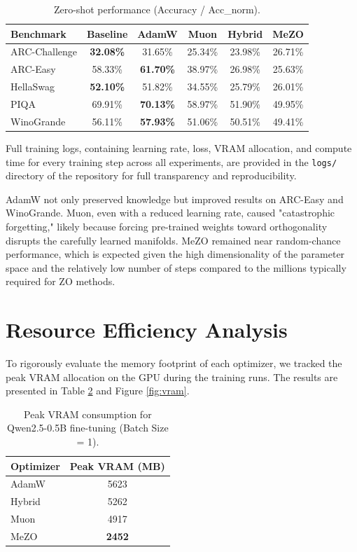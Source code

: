 \documentclass{article}
\begin{document}
\begin{table}[h]
\centering
\begin{tabular}{lccccc}
\toprule
\textbf{Benchmark} & \textbf{Baseline} & \textbf{AdamW} & \textbf{Muon} & \textbf{Hybrid} & \textbf{MeZO} \\
\midrule
ARC-Challenge & \textbf{32.08\%} & 31.65\% & 25.34\% & 23.98\% & 26.71\% \\
ARC-Easy & 58.33\% & \textbf{61.70\%} & 38.97\% & 26.98\% & 25.63\% \\
HellaSwag & \textbf{52.10\%} & 51.82\% & 34.55\% & 25.79\% & 26.01\% \\
PIQA & 69.91\% & \textbf{70.13\%} & 58.97\% & 51.90\% & 49.95\% \\
WinoGrande & 56.11\% & \textbf{57.93\%} & 51.06\% & 50.51\% & 49.41\% \\
\bottomrule
\end{tabular}
\caption{Zero-shot performance (Accuracy / Acc_norm).}
\label{tab:results}
\end{table}

Full training logs, containing learning rate, loss, VRAM allocation, and compute time for every training step across all experiments, are provided in the \texttt{logs/} directory of the repository for full transparency and reproducibility.

AdamW not only preserved knowledge but improved results on ARC-Easy and WinoGrande. Muon, even with a reduced learning rate, caused "catastrophic forgetting," likely because forcing pre-trained weights toward orthogonality disrupts the carefully learned manifolds. MeZO remained near random-chance performance, which is expected given the high dimensionality of the parameter space and the relatively low number of steps compared to the millions typically required for ZO methods.

\section{Resource Efficiency Analysis}

To rigorously evaluate the memory footprint of each optimizer, we tracked the peak VRAM allocation on the GPU during the training runs. The results are presented in Table \ref{tab:vram} and Figure \ref{fig:vram}.

\begin{table}[h]
\centering
\begin{tabular}{lc}
\toprule
\textbf{Optimizer} & \textbf{Peak VRAM (MB)} \\
\midrule
AdamW & 5623 \\
Hybrid & 5262 \\
Muon & 4917 \\
MeZO & \textbf{2452} \\
\bottomrule
\end{tabular}
\caption{Peak VRAM consumption for Qwen2.5-0.5B fine-tuning (Batch Size = 1).}
\label{tab:vram}
\end{table}
\end{document}
